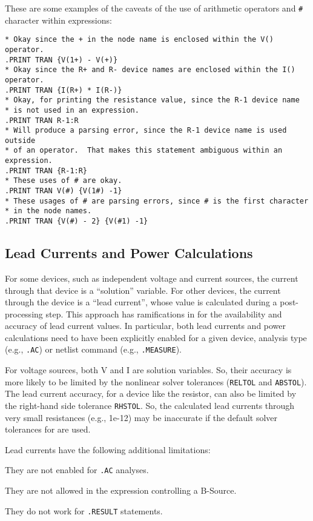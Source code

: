 These are some examples of the caveats of the use of arithmetic operators
and \verb|#| character within expressions:
\begin{verbatim}
* Okay since the + in the node name is enclosed within the V() operator.
.PRINT TRAN {V(1+) - V(+)}
* Okay since the R+ and R- device names are enclosed within the I() operator.
.PRINT TRAN {I(R+) * I(R-)}
* Okay, for printing the resistance value, since the R-1 device name
* is not used in an expression.
.PRINT TRAN R-1:R
* Will produce a parsing error, since the R-1 device name is used outside
* of an operator.  That makes this statement ambiguous within an expression.
.PRINT TRAN {R-1:R}
* These uses of # are okay.
.PRINT TRAN V(#) {V(1#) -1}
* These usages of # are parsing errors, since # is the first character
* in the node names.
.PRINT TRAN {V(#) - 2} {V(#1) -1}
\end{verbatim}

\subsection{Lead Currents and Power Calculations}
\label{leadCurrentPowerCalculations}
  For some devices,
such as independent voltage and current sources, the current through
that device is a ``solution'' variable.  For other devices, the
current through the device is a ``lead current'', whose value is
calculated during a post-processing step.  This approach has
ramifications in \Xyce{} for the availability and accuracy of lead
current values.  In particular, both lead currents and power
calculations need to have been explicitly enabled for a given device,
analysis type (e.g., \texttt{.AC}) or netlist command (e.g.,
\texttt{.MEASURE}).

For voltage sources, both V and I are solution variables.  So, their
accuracy is more likely to be limited by the nonlinear solver
tolerances (\texttt{RELTOL} and \texttt{ABSTOL}).  The lead current
accuracy, for a device like the resistor, can also be limited by the
right-hand side tolerance \texttt{RHSTOL}.  So, the calculated lead
currents through very small resistances (e.g., 1e-12) may be
inaccurate if the default solver tolerances for \Xyce{} are used.

Lead currents have the following additional limitations:
\begin{XyceItemize}
\item They are not enabled for \texttt{.AC} analyses.
\item They are not allowed in the expression controlling a B-Source.
\item They do not work for \texttt{.RESULT} statements.
\end{XyceItemize}

